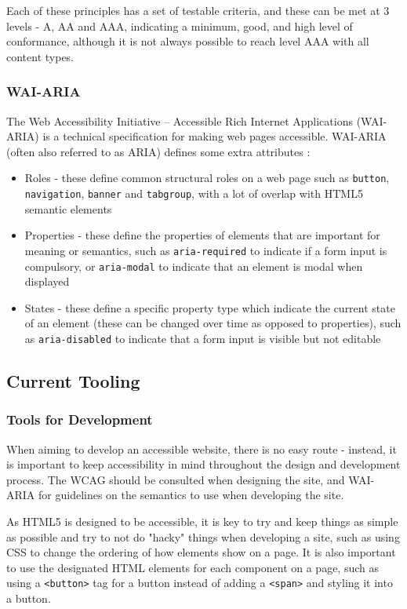 \documentclass[ %
                    author={Aleena Baig},
                supervisor={Dr Simon Lock},
                    degree={BSc},
                     title={On Making Web Accessible Graphs},
                  subtitle={},
                      year={2019} ]{dissertation}
\begin{document}
Each of these principles has a set of testable criteria, and these can be met at 3 levels - A, AA and AAA, indicating a minimum, good, and high level of conformance, although it is not always possible to reach level AAA with all content types.

\subsubsection{WAI-ARIA}

The Web Accessibility Initiative – Accessible Rich Internet Applications (WAI-ARIA) is a technical specification for making web pages accessible. WAI-ARIA (often also referred to as ARIA) defines some extra attributes :

\begin{itemize}
    \item Roles - these define common structural roles on a web page such as \texttt{button}, \texttt{navigation}, \texttt{banner} and \texttt{tabgroup}, with a lot of overlap with HTML5 semantic elements
    \item Properties - these define the properties of elements that are important for meaning or semantics, such as \texttt{aria-required} to indicate if a form input is compulsory, or \texttt{aria-modal} to indicate that an element is modal when displayed
    \item States - these define a specific property type which indicate the current state of an element (these can be changed over time as opposed to properties), such as \texttt{aria-disabled} to indicate that a form input is visible but not editable
\end{itemize}

\subsection{Current Tooling}

\subsubsection{Tools for Development}

When aiming to develop an accessible website, there is no easy route - instead, it is important to keep accessibility in mind throughout the design and development process. The WCAG should be consulted when designing the site, and WAI-ARIA for guidelines on the semantics to use when developing the site.

As HTML5 is designed to be accessible, it is key to try and keep things as simple as possible and try to not do "hacky" things when developing a site, such as using CSS to change the ordering of how elements show on a page. It is also important to use the designated HTML elements for each component on a page, such as using a \texttt{<button>} tag for a button instead of adding a \texttt{<span>} and styling it into a button.
\end{document}
